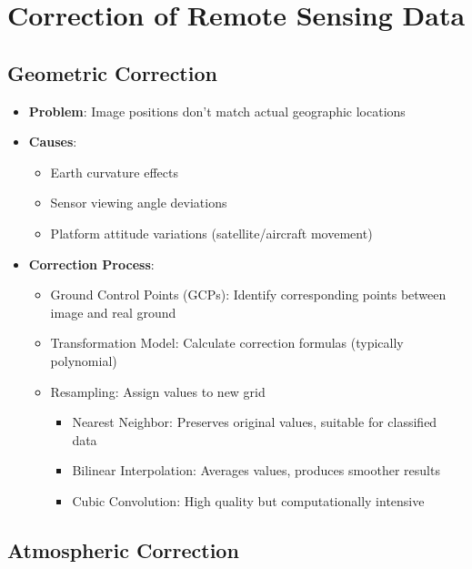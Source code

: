 \documentclass[
  letterpaper,
]{scrbook}
\providecommand{\tightlist}{%
  \setlength{\itemsep}{0pt}\setlength{\parskip}{0pt}}\usepackage{longtable,booktabs,array}
\begin{document}
\section{Correction of Remote Sensing
Data}\label{correction-of-remote-sensing-data}

\subsection{Geometric Correction}\label{geometric-correction}

\begin{itemize}
\tightlist
\item
  \textbf{Problem}: Image positions don't match actual geographic
  locations
\item
  \textbf{Causes}:

  \begin{itemize}
  \tightlist
  \item
    Earth curvature effects
  \item
    Sensor viewing angle deviations
  \item
    Platform attitude variations (satellite/aircraft movement)
  \end{itemize}
\item
  \textbf{Correction Process}:

  \begin{itemize}
  \tightlist
  \item
    Ground Control Points (GCPs): Identify corresponding points between
    image and real ground
  \item
    Transformation Model: Calculate correction formulas (typically
    polynomial)
  \item
    Resampling: Assign values to new grid

    \begin{itemize}
    \tightlist
    \item
      Nearest Neighbor: Preserves original values, suitable for
      classified data
    \item
      Bilinear Interpolation: Averages values, produces smoother results
    \item
      Cubic Convolution: High quality but computationally intensive
    \end{itemize}
  \end{itemize}
\end{itemize}

\subsection{Atmospheric Correction}\label{atmospheric-correction}
\end{document}
